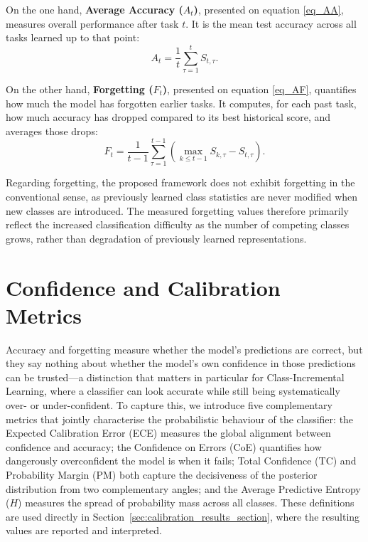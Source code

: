 On the one hand, \textbf{Average Accuracy ($A_t$)}, presented on equation \eqref{eq_AA}, measures overall performance after task $t$. It is the mean test accuracy across all tasks learned up to that point:
\begin{equation}
	A_t = \frac{1}{t} \sum_{\tau=1}^{t} S_{t,\tau}.
	\label{eq_AA}
\end{equation}

On the other hand, \textbf{Forgetting ($F_{t}$)}, presented on equation \eqref{eq_AF}, quantifies how much the model has forgotten earlier tasks. It computes, for each past task, how much accuracy has dropped compared to its best historical score, and averages those drops:
\begin{equation}
	F_t = \frac{1}{t-1} \sum_{\tau=1}^{t-1} \left( \max_{k \le t-1} S_{k,\tau} - S_{t,\tau} \right).
	\label{eq_AF}
\end{equation}

Regarding forgetting, the proposed framework does not exhibit forgetting in the conventional sense, as previously learned class statistics are never modified when new classes are introduced. The measured forgetting values therefore primarily reflect the increased classification difficulty as the number of competing classes grows, rather than degradation of previously learned representations.

\section{Confidence and Calibration Metrics}
\label{sec:an:calibration_metrics_def}

Accuracy and forgetting measure whether the model's predictions are correct, but they say nothing about whether the model's own confidence in those predictions can be trusted---a distinction that matters in particular for Class-Incremental Learning, where a classifier can look accurate while still being systematically over- or under-confident. To capture this, we introduce five complementary metrics that jointly characterise the probabilistic behaviour of the classifier: the Expected Calibration Error (ECE) measures the global alignment between confidence and accuracy; the Confidence on Errors (CoE) quantifies how dangerously overconfident the model is when it fails; Total Confidence (TC) and Probability Margin (PM) both capture the decisiveness of the posterior distribution from two complementary angles; and the Average Predictive Entropy ($H$) measures the spread of probability mass across all classes. These definitions are used directly in Section~\ref{sec:calibration_results_section}, where the resulting values are reported and interpreted.

